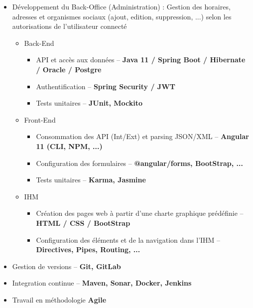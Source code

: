 \documentclass[12pt,a4paper,sans]{moderncv} %
\begin{document}
{\begin{itemize}
\item Développement du Back-Office (Administration) : Gestion des horaires, adresses et organismes sociaux (ajout, edition, suppression, ...) selon les autorisations de l'utilisateur connecté
    \begin{itemize}
    
\vspace{1ex}
	\item Back-End
        \begin{itemize}
            \item API et accès aux données -- \textbf{Java 11 / Spring Boot / Hibernate / Oracle / Postgre}
            \item Authentification -- \textbf{Spring Security / JWT}
            \item Tests unitaires -- \textbf{JUnit, Mockito}
        \end{itemize}
        
\vspace{1ex}
    \item Front-End 
        \begin{itemize}
            \item Consommation des API (Int/Ext) et parsing JSON/XML -- \textbf{Angular 11 (CLI, NPM, ...)}
            \item Configuration des formulaires -- \textbf{@angular/forms, BootStrap, ... }
            \item Tests unitaires -- \textbf{Karma, Jasmine}
        \end{itemize}
    
\vspace{1ex}
    \item IHM 
    	\begin{itemize}
            \item Création des pages web à partir d'une charte graphique prédéfinie -- \textbf{HTML / CSS / BootStrap}
            \item Configuration des éléments et de la navigation dans l'IHM -- \textbf{Directives, Pipes, Routing, ... }
        \end{itemize}
\vspace{1ex}
	\end{itemize}
\item Gestion de versions -- \textbf{Git, GitLab}
\item Integration continue -- \textbf{Maven, Sonar, Docker, Jenkins}
\item Travail en méthodologie \textbf{Agile}
\end{itemize}}
\end{document}
